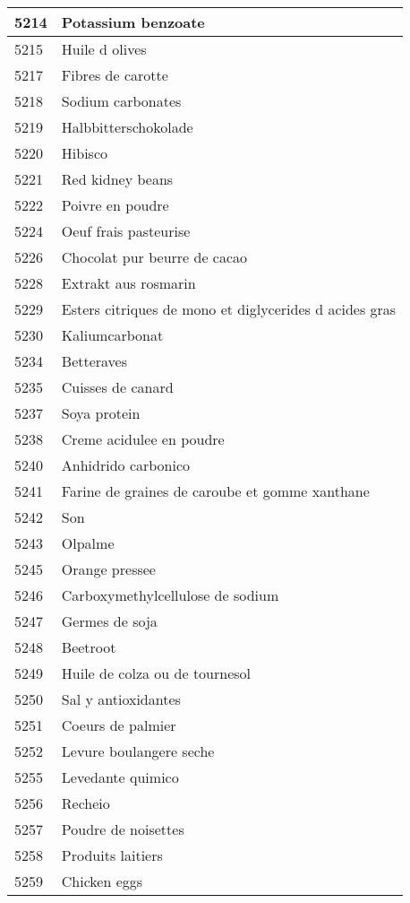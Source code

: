 \begin{longtable}{|l|l|}
5214 & Potassium benzoate \\ \hline 
5215 & Huile d olives \\ \hline 
5217 & Fibres de carotte \\ \hline 
5218 & Sodium carbonates \\ \hline 
5219 & Halbbitterschokolade \\ \hline 
5220 & Hibisco \\ \hline 
5221 & Red kidney beans \\ \hline 
5222 & Poivre en poudre \\ \hline 
5224 & Oeuf frais pasteurise \\ \hline 
5226 & Chocolat pur beurre de cacao \\ \hline 
5228 & Extrakt aus rosmarin \\ \hline 
5229 & Esters citriques de mono et diglycerides d acides gras \\ \hline 
5230 & Kaliumcarbonat \\ \hline 
5234 & Betteraves \\ \hline 
5235 & Cuisses de canard \\ \hline 
5237 & Soya protein \\ \hline 
5238 & Creme acidulee en poudre \\ \hline 
5240 & Anhidrido carbonico \\ \hline 
5241 & Farine de graines de caroube et gomme xanthane \\ \hline 
5242 & Son \\ \hline 
5243 & Olpalme \\ \hline 
5245 & Orange pressee \\ \hline 
5246 & Carboxymethylcellulose de sodium \\ \hline 
5247 & Germes de soja \\ \hline 
5248 & Beetroot \\ \hline 
5249 & Huile de colza ou de tournesol \\ \hline 
5250 & Sal y antioxidantes \\ \hline 
5251 & Coeurs de palmier \\ \hline 
5252 & Levure boulangere seche \\ \hline 
5255 & Levedante quimico \\ \hline 
5256 & Recheio \\ \hline 
5257 & Poudre de noisettes \\ \hline 
5258 & Produits laitiers \\ \hline 
5259 & Chicken eggs \\ \hline 

\end{longtable}
